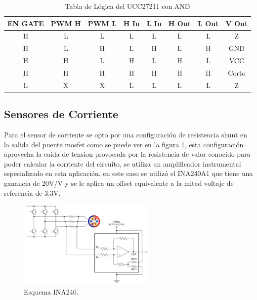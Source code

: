 \documentclass[11pt]{report}
\begin{document}
\begin{table}[ht]
	\centering
	\caption{Tabla de Lógica del UCC27211 con AND}
	\label{UCC27211_logic}
	\begin{tabular}{|c|c|c|c|c|c|c|c|}
		\hline
		\textbf{EN GATE} & \textbf{PWM H} & \textbf{PWM L} & \textbf{H In} & \textbf{L In} & \textbf{H Out} & \textbf{L Out} & \textbf{V Out} \\
		\hline
		H                & L              & L              & L             & L             & L              & L              & Z              \\ \hline
		H                & L              & H              & L             & H             & L              & H              & GND            \\ \hline
		H                & H              & L              & H             & L             & H              & L              & VCC            \\ \hline
		H                & H              & H              & H             & H             & H              & H              & Corto          \\ \hline
		L                & X              & X              & L             & L             & L              & L              & Z              \\ \hline
	\end{tabular}
\end{table}
\FloatBarrier


\newpage
\subsection{Sensores de Corriente}

Para el sensor de corriente se opto por una configuración de resistencia shunt en la salida del puente mosfet como se puede ver en la figura \ref{INA240}, esta configuración aprovecha la caída de tension provocada por la resistencia de valor conocido para poder calcular la corriente del circuito, se utiliza un amplificador instrumental especializado en esta aplicación, en este caso se utilizó el INA240A1 que tiene una ganancia de 20V/V y se le aplica un offset equivalente a la mitad voltaje de referencia de 3.3V.

\begin{figure}[ht]
	\centering
	\includegraphics[width=0.6\textwidth]{imagenes/Diagramas/INA240.png}
	\caption{Esquema INA240.}
	\label{INA240}
\end{figure}
\FloatBarrier
\end{document}
